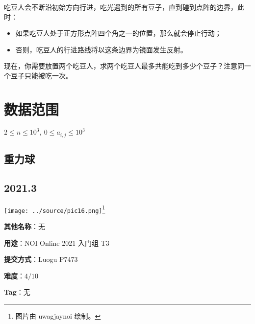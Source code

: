 \documentclass[a4paper,10pt]{article}
\begin{document}
吃豆人会不断沿初始方向行进，吃光遇到的所有豆子，直到碰到点阵的边界，此时：

\begin{itemize}
\item 如果吃豆人处于正方形点阵四个角之一的位置，那么就会停止行动；

\item 否则，吃豆人的行进路线将以这条边界为镜面发生反射。
\end{itemize}

现在，你需要放置两个吃豆人，求两个吃豆人最多共能吃到多少个豆子？注意同一个豆子只能被吃一次。

\section*{数据范围}

$2\leq n\leq 10^3,\ 0\leq a_{i,j}\leq 10^3$

\newpage

\vspace*{\fill}
\begin{center}

\section{重力球}

\subsection*{2021.3}

\vspace{10pt}

\texttt{[image: ../source/pic16.png]}\footnote{图片由 uwagjaynoi 绘制。}

\vspace{10pt}

\textbf{其他名称}：无

\vspace{10pt}

\textbf{用途}：NOI Online 2021 入门组 T3

\vspace{10pt}

\textbf{提交方式}：Luogu P7473

\vspace{10pt}

\textbf{难度}：$4/10$

\vspace{10pt}

\textbf{Tag}：无

\end{center}
\vspace*{\fill}
\end{document}
